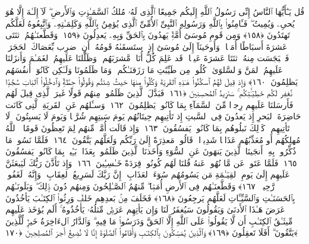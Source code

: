  قُل يَـٰٓأَيُّهَا ٱلنَّاسُ إِنِّى رَسُولُ ٱللَّهِ إِلَيكُم جَمِيعًا ٱلَّذِى لَهُۥ مُلكُ ٱلسَّمَـٰوَٟتِ وَٱلأَرضِ ۖ لَآ إِلَـٰهَ إِلَّا هُوَ يُحىِۦ وَيُمِيتُ ۖ فَـَٔامِنُوا۟ بِٱللَّهِ وَرَسُولِهِ ٱلنَّبِىِّ ٱلأُمِّىِّ ٱلَّذِى يُؤمِنُ بِٱللَّهِ وَكَلِمَـٰتِهِۦ وَٱتَّبِعُوهُ لَعَلَّكُم تَهتَدُونَ ﴿١٥٨﴾
 وَمِن قَومِ مُوسَىٰٓ أُمَّةٌۭ يَهدُونَ بِٱلحَقِّ وَبِهِۦ يَعدِلُونَ ﴿١٥٩﴾
 وَقَطَّعنَـٰهُمُ ٱثنَتَى عَشرَةَ أَسبَاطًا أُمَمًۭا ۚ وَأَوحَينَآ إِلَىٰ مُوسَىٰٓ إِذِ ٱستَسقَىٰهُ قَومُهُۥٓ أَنِ ٱضرِب بِّعَصَاكَ ٱلحَجَرَ ۖ فَٱنۢبَجَسَت مِنهُ ٱثنَتَا عَشرَةَ عَينًۭا ۖ قَد عَلِمَ كُلُّ أُنَاسٍۢ مَّشرَبَهُم ۚ وَظَلَّلنَا عَلَيهِمُ ٱلغَمَـٰمَ وَأَنزَلنَا عَلَيهِمُ ٱلمَنَّ وَٱلسَّلوَىٰ ۖ كُلُوا۟ مِن طَيِّبَٰتِ مَا رَزَقنَـٰكُم ۚ وَمَا ظَلَمُونَا وَلَـٰكِن كَانُوٓا۟ أَنفُسَهُم يَظلِمُونَ ﴿١٦٠﴾
 وَإِذ قِيلَ لَهُمُ ٱسكُنُوا۟ هَـٰذِهِ ٱلقَريَةَ وَكُلُوا۟ مِنهَا حَيثُ شِئتُم وَقُولُوا۟ حِطَّةٌۭ وَٱدخُلُوا۟ ٱلبَابَ سُجَّدًۭا نَّغفِر لَكُم خَطِيٓـَٰٔتِكُم ۚ سَنَزِيدُ ٱلمُحسِنِينَ ﴿١٦١﴾
 فَبَدَّلَ ٱلَّذِينَ ظَلَمُوا۟ مِنهُم قَولًا غَيرَ ٱلَّذِى قِيلَ لَهُم فَأَرسَلنَا عَلَيهِم رِجزًۭا مِّنَ ٱلسَّمَآءِ بِمَا كَانُوا۟ يَظلِمُونَ ﴿١٦٢﴾
 وَسـَٔلهُم عَنِ ٱلقَريَةِ ٱلَّتِى كَانَت حَاضِرَةَ ٱلبَحرِ إِذ يَعدُونَ فِى ٱلسَّبتِ إِذ تَأتِيهِم حِيتَانُهُم يَومَ سَبتِهِم شُرَّعًۭا وَيَومَ لَا يَسبِتُونَ ۙ لَا تَأتِيهِم ۚ كَذَٟلِكَ نَبلُوهُم بِمَا كَانُوا۟ يَفسُقُونَ ﴿١٦٣﴾
 وَإِذ قَالَت أُمَّةٌۭ مِّنهُم لِمَ تَعِظُونَ قَومًا ۙ ٱللَّهُ مُهلِكُهُم أَو مُعَذِّبُهُم عَذَابًۭا شَدِيدًۭا ۖ قَالُوا۟ مَعذِرَةً إِلَىٰ رَبِّكُم وَلَعَلَّهُم يَتَّقُونَ ﴿١٦٤﴾
 فَلَمَّا نَسُوا۟ مَا ذُكِّرُوا۟ بِهِۦٓ أَنجَينَا ٱلَّذِينَ يَنهَونَ عَنِ ٱلسُّوٓءِ وَأَخَذنَا ٱلَّذِينَ ظَلَمُوا۟ بِعَذَابٍۭ بَـِٔيسٍۭ بِمَا كَانُوا۟ يَفسُقُونَ ﴿١٦٥﴾
 فَلَمَّا عَتَوا۟ عَن مَّا نُهُوا۟ عَنهُ قُلنَا لَهُم كُونُوا۟ قِرَدَةً خَـٰسِـِٔينَ ﴿١٦٦﴾
 وَإِذ تَأَذَّنَ رَبُّكَ لَيَبعَثَنَّ عَلَيهِم إِلَىٰ يَومِ ٱلقِيَـٰمَةِ مَن يَسُومُهُم سُوٓءَ ٱلعَذَابِ ۗ إِنَّ رَبَّكَ لَسَرِيعُ ٱلعِقَابِ ۖ وَإِنَّهُۥ لَغَفُورٌۭ رَّحِيمٌۭ ﴿١٦٧﴾
 وَقَطَّعنَـٰهُم فِى ٱلأَرضِ أُمَمًۭا ۖ مِّنهُمُ ٱلصَّـٰلِحُونَ وَمِنهُم دُونَ ذَٟلِكَ ۖ وَبَلَونَـٰهُم بِٱلحَسَنَـٰتِ وَٱلسَّيِّـَٔاتِ لَعَلَّهُم يَرجِعُونَ ﴿١٦٨﴾
 فَخَلَفَ مِنۢ بَعدِهِم خَلفٌۭ وَرِثُوا۟ ٱلكِتَـٰبَ يَأخُذُونَ عَرَضَ هَـٰذَا ٱلأَدنَىٰ وَيَقُولُونَ سَيُغفَرُ لَنَا وَإِن يَأتِهِم عَرَضٌۭ مِّثلُهُۥ يَأخُذُوهُ ۚ أَلَم يُؤخَذ عَلَيهِم مِّيثَـٰقُ ٱلكِتَـٰبِ أَن لَّا يَقُولُوا۟ عَلَى ٱللَّهِ إِلَّا ٱلحَقَّ وَدَرَسُوا۟ مَا فِيهِ ۗ وَٱلدَّارُ ٱلءَاخِرَةُ خَيرٌۭ لِّلَّذِينَ يَتَّقُونَ ۗ أَفَلَا تَعقِلُونَ ﴿١٦٩﴾
 وَٱلَّذِينَ يُمَسِّكُونَ بِٱلكِتَـٰبِ وَأَقَامُوا۟ ٱلصَّلَوٰةَ إِنَّا لَا نُضِيعُ أَجرَ ٱلمُصلِحِينَ ﴿١٧٠﴾
